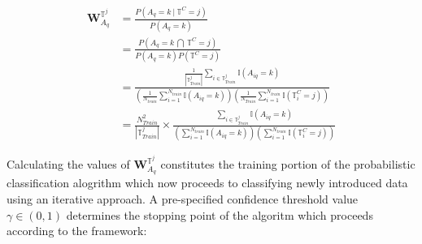 \documentclass[12pt,]{article}
\begin{document}
\begin{align*}
  \mathbf{W}_{A_{q}}^{\mathbb{T}^j} &= \frac{P\left(A_{q} = k \ \Big | \ \mathbb{T}^{C}=j \right) }{P\left( A_{q} = k   \right) } \tag{EQ: 1.3.2-1} \label{EQ: 1.3.2-1} \\[0.5em]
&= \frac{P\left(A_{q} = k \ \bigcap \ \mathbb{T}^{C}=j \right)}{P\left( A_{q} = k   \right)P\left( \mathbb{T}^{C}=j  \right)}\\[0.5em]
&= \frac{\frac{1}{|\mathbb{T}_{Train}^{j}|} \sum_{i \in \mathbb{T}_{Train}^{j}} \mathbb{I} \left(A_{iq}=k \right)}{\left( \frac{1}{N_{train}} \sum_{i=1}^{N_{train}} \mathbb{I}\left(A_{iq}=k \right) \right) \left( \frac{1}{N_{Train}} \sum_{i=1}^{N_{train}} \mathbb{I}\left(\mathbb{T}_{i}^{C}=j \right) \right) }\\[0.5em]
&= \frac{N_{Train}^{2}}{|\mathbb{T}_{Train}^{j}|} \times \frac{\sum_{i \in \mathbb{T}_{Train}^{j}} \mathbb{I} \left(A_{iq}=k \right)}{\left( \sum_{i=1}^{N_{train}} \mathbb{I}\left(A_{iq}=k \right)  \right)  \left(  \sum_{i=1}^{N_{train}} \mathbb{I}\left(\mathbb{T}_{i}^{C}=j \right)  \right) }   
\end{align*}

Calculating the values of \(\mathbf{W}_{A_{q}}^{\mathbb{T}^{j}}\)
constitutes the training portion of the probabilistic classification
alogrithm which now proceeds to classifying newly introduced data using
an iterative approach. A pre-specified confidence threshold value
\(\gamma \in (0,1)\) determines the stopping point of the algoritm which
proceeds according to the framework:
\end{document}
